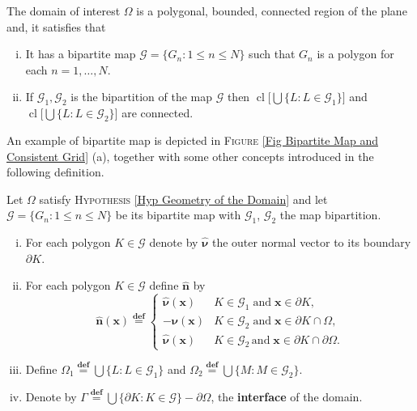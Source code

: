 \documentclass[3p]{elsarticle}
\DeclareMathOperator*{\cl}{cl}
\def\n{\bm{\widehat{ n} } }
\def\x{\mathbf x}
\def\outer{\bm {\widehat{\nu} } }
\def\defining{\overset{\mathbf{def}} =}
\def\map{\mathcal{G} }%
\def\mapone{\mathcal{G}_{1} }%
\def\maptwo{\mathcal{G}_{2}} %
\def\Omeone{\Omega_{1}}
\def\Ometwo{\Omega_{2}}
\begin{document}
%
%
\begin{hypothesis}\label{Hyp Geometry of the Domain}
The domain of interest $\Omega$ is a polygonal, bounded, connected region of the plane and, it satisfies that 
%
\begin{enumerate}[(i)]
\item It has a bipartite map $\mathcal{G} = \{G_{n}: 1\leq n \leq N \}$ such that $G_{n}$ is a polygon for each $n = 1, \ldots, N$. 

\item If $\mapone, \maptwo$ is the bipartition of the map $\map$ then $\cl \big[\bigcup \{L:L\in \mapone\} \big]$ and $\cl \big[ \bigcup \{L:L\in \maptwo\} \big]$ are connected. 
\end{enumerate}
%
%
\end{hypothesis}
%
%
An example of bipartite map is depicted in \textsc{Figure} \ref{Fig Bipartite Map and Consistent Grid} (a), together with some other concepts introduced in the following definition.
%
%
\begin{definition}\label{Def geometric convention WVF}
Let $\Omega$ satisfy \textsc{Hypothesis} \ref{Hyp Geometry of the Domain} and let $\mathcal{G} = \{G_{n}: 1\leq n \leq N \}$ be its bipartite map with $\mathcal{G}_{1}$, $\mathcal{G}_{2}$ the map bipartition.
%
\begin{enumerate}[(i)]
\item
For each polygon $K\in \map$ denote by $\outer$ the outer normal vector to its boundary $\partial K$.

\item
For each polygon $K\in \map$ define $\n$ by
%
\begin{equation}\label{Def normal vector}
\n(\x) \defining\begin{cases}
\outer(\x) & K\in \mapone\; \text{and}\;\x \in \partial K  ,\\
-\outer(\x) & K \in \maptwo\; \text{and}\;\x \in \partial K\cap \Omega , \\
\outer(\x) & K \in \maptwo \, \text{and} \;\x \in \partial K\cap \partial \Omega .
\end{cases}
\end{equation}
%

\item
Define $\displaystyle \Omeone \defining \bigcup \{L:L\in \mapone\}$ and $\displaystyle\Ometwo \defining \bigcup \{M:M\in \maptwo\}$.

\item
Denote by $\displaystyle\Gamma\defining \bigcup\{\partial K: K\in \map\} - \partial \Omega$, the \textbf{interface} of the domain.

\end{enumerate}
%
\end{definition}
\end{document}
